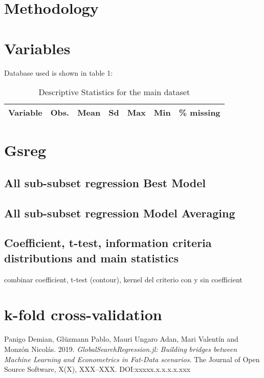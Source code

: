 \documentclass{article}
\begin{document}
\section{Methodology}


\section{Variables}

Database used is shown in table 1:

\begin{table}[!h]
  \centering
  \caption{Descriptive Statistics for the main dataset}
    \begin{tabular}{|p{5cm}|c|c|c|c|c|c|}
    \hline
    Variable & Obs. & Mean & Sd & Max & Min & \% missing \\
    \hline
    \hline
    \end{tabular}
\end{table}


\section{Gsreg}

\subsection{All sub-subset regression Best Model}

\subsection{All sub-subset regression Model Averaging}

\subsection{Coefficient, t-test, information criteria distributions and main statistics}

combinar coefficient, t-test (contour), kernel del criterio con y sin coefficient

\section{k-fold cross-validation}


  
\begin{thebibliography}{1}

Panigo Demian, Glüzmann Pablo, Mauri Ungaro Adan, Mari Valentín and Monzón Nicolás. 2019.
\newblock \textit{GlobalSearchRegression.jl: Building bridges between Machine Learning and Econometrics in Fat-Data scenarios}.
\newblock The Journal of Open Source Software, X(X), XXX--XXX. DOI:xxxxx.x.x.x.x.xxx

\end{thebibliography}
\end{document}
